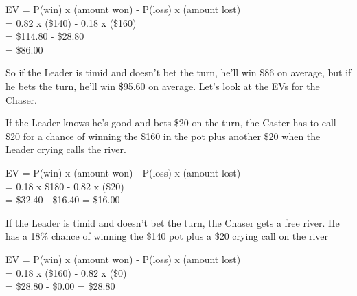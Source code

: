 EV = P(win) x (amount won) - P(loss) x (amount lost) \\
   = 0.82   x (\$140)      - 0.18    x (\$160) \\
   = \$114.80 - \$28.80 \\
   = \$86.00

So if the Leader is timid and doesn't bet the turn, he'll win \$86 on
average, but if he bets the turn, he'll win \$95.60 on average. Let's
look at the EVs for the Chaser.

If the Leader knows he's good and bets \$20 on the turn, the Caster
has to call \$20 for a chance of winning the \$160 in the pot plus
another \$20 when the Leader crying calls the river.

EV = P(win) x (amount won) - P(loss) x (amount lost) \\
   = 0.18 x \$180 - 0.82 x (\$20) \\
   = \$32.40 - \$16.40
   = \$16.00

If the Leader is timid and doesn't bet the turn, the Chaser gets a
free river. He has a 18\% chance of winning the \$140 pot plus a \$20
crying call on the river

EV = P(win) x (amount won) - P(loss) x (amount lost) \\
   = 0.18 x (\$160) - 0.82 x (\$0) \\
   = \$28.80 - \$0.00
   = \$28.80
